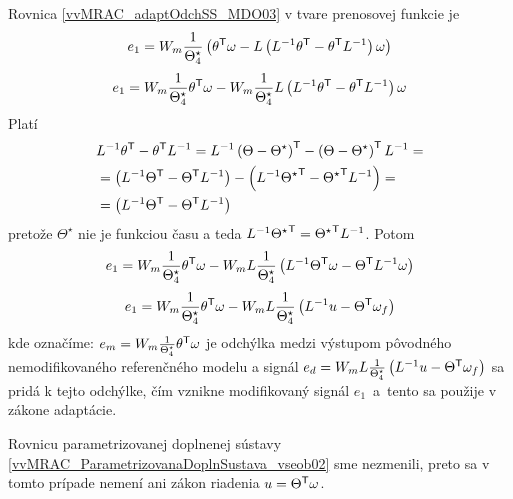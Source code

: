 ﻿\documentclass[a4paper, 10pt, ]{article}
\begin{document}
Rovnica \eqref{vvMRAC_adaptOdchSS_MDO03} v tvare prenosovej funkcie je
\begin{equation}
	e_1
	=
	W_m
	\frac{1}{\Theta_4^\star}
	\left(
		\theta^{\mathsf{T}}
		\omega
		-
		L
			\left(
				L^{-1}
				\theta^{\mathsf{T}}
				-
				\theta^{\mathsf{T}}
				L^{-1}
				\right)
		\omega
	\right)
\end{equation}
\begin{equation}
	e_1
	=
	W_m
	\frac{1}{\Theta_4^\star}
	\theta^{\mathsf{T}}
	\omega
	-
	W_m
	\frac{1}{\Theta_4^\star}
		L
			\left(
				L^{-1}
				\theta^{\mathsf{T}}
				-
				\theta^{\mathsf{T}}
				L^{-1}
			\right)
		\omega
\end{equation}
Platí
\begin{align}
\begin{split}
	&
	L^{-1}
	\theta^{\mathsf{T}}
	-
	\theta^{\mathsf{T}}
	L^{-1}
	=
	L^{-1}
	\left(
		\Theta - \Theta^\star
	\right)^{\mathsf{T}}
	-
	\left(
		\Theta - \Theta^\star
	\right)^{\mathsf{T}}
	L^{-1}
	=\\&=
	\left(
		L^{-1}
		\Theta^{\mathsf{T}}
		-
		\Theta^{\mathsf{T}}
		L^{-1}
	\right)
	-
	\left(
		L^{-1}
		{\Theta^\star}^{\mathsf{T}}
		-
		{\Theta^\star}^{\mathsf{T}}
		L^{-1}
	\right)
	=\\&=
	\left(
		L^{-1}
		\Theta^{\mathsf{T}}
		-
		\Theta^{\mathsf{T}}
		L^{-1}
	\right)
	\end{split}
\end{align}
pretože $\Theta^\star$ nie je funkciou času a teda $L^{-1} {\Theta^\star}^{\mathsf{T}} = {\Theta^\star}^{\mathsf{T}}  L^{-1}$.
Potom
\begin{equation}
	e_1
	=
	W_m
	\frac{1}{\Theta_4^\star}
	\theta^{\mathsf{T}}
	\omega
	-
	W_m
	L
	\frac{1}{\Theta_4^\star}
	\left(
		L^{-1}
		\Theta^{\mathsf{T}}
		\omega
		-
		\Theta^{\mathsf{T}}
		L^{-1}
		\omega
	\right)
\end{equation}
\begin{equation}
	e_1
	=
	W_m
	\frac{1}{\Theta_4^\star}
	\theta^{\mathsf{T}}
	\omega
	-
	W_m
	L
	\frac{1}{\Theta_4^\star}
	\left(
		L^{-1}
		u
		-
		\Theta^{\mathsf{T}}
		\omega_f
	\right)
\end{equation}
kde označíme:
$e_m = W_m \frac{1}{\Theta_4^\star} \theta^{\mathsf{T}} \omega$ je odchýlka medzi výstupom pôvodného nemodifikovaného referenčného modelu a signál $e_d = W_m L \frac{1}{\Theta_4^\star} \left( L^{-1} u - \Theta^{\mathsf{T}} \omega_f \right) $ sa pridá k tejto odchýlke, čím vznikne modifikovaný signál $e_1$~a~tento sa použije v zákone adaptácie.

Rovnicu parametrizovanej doplnenej sústavy \eqref{vvMRAC_ParametrizovanaDoplnSustava_vseob02} sme nezmenili, preto sa v tomto prípade nemení ani zákon riadenia $u = \Theta^{\mathsf{T}} \omega$.
\end{document}
